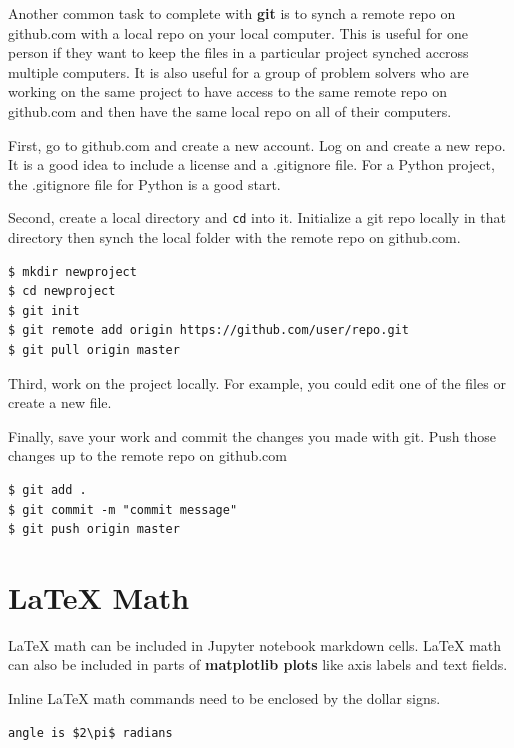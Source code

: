 \documentclass{book}
\begin{document}
    
        Another common task to complete with \textbf{git} is to synch a remote
repo on github.com with a local repo on your local computer. This is
useful for one person if they want to keep the files in a particular
project synched accross multiple computers. It is also useful for a
group of problem solvers who are working on the same project to have
access to the same remote repo on github.com and then have the same
local repo on all of their computers.

First, go to github.com and create a new account. Log on and create a
new repo. It is a good idea to include a license and a .gitignore file.
For a Python project, the .gitignore file for Python is a good start.

Second, create a local directory and \lstinline!cd! into it. Initialize
a git repo locally in that directory then synch the local folder with
the remote repo on github.com.

\begin{lstlisting}
$ mkdir newproject
$ cd newproject
$ git init
$ git remote add origin https://github.com/user/repo.git
$ git pull origin master
\end{lstlisting}

Third, work on the project locally. For example, you could edit one of
the files or create a new file.

Finally, save your work and commit the changes you made with git. Push
those changes up to the remote repo on github.com

\begin{lstlisting}
$ git add .
$ git commit -m "commit message"
$ git push origin master
\end{lstlisting}
    




    
        \section{LaTeX Math}\label{latex-math}
    




    
        LaTeX math can be included in Jupyter notebook markdown cells. LaTeX
math can also be included in parts of \textbf{matplotlib plots} like
axis labels and text fields.

Inline LaTeX math commands need to be enclosed by the dollar signs.

\begin{lstlisting}
angle is $2\pi$ radians
\end{lstlisting}
\end{document}
